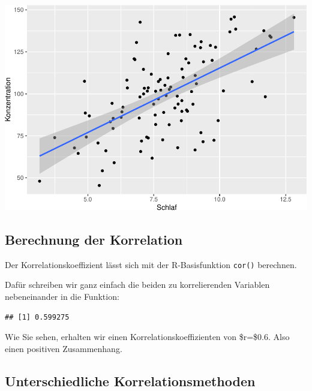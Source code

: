 \documentclass[
]{book}
\newenvironment{Shaded}{\begin{snugshade}}{\end{snugshade}}
\newcommand{\FunctionTok}[1]{\textcolor[rgb]{0.00,0.00,0.00}{#1}}
\newcommand{\NormalTok}[1]{#1}
\newcommand{\SpecialCharTok}[1]{\textcolor[rgb]{0.00,0.00,0.00}{#1}}
\begin{document}
\includegraphics{CFH_R_bookdown_files/figure-latex/unnamed-chunk-115-1.pdf}

\hypertarget{berechnung-der-korrelation}{%
\subsection{Berechnung der Korrelation}\label{berechnung-der-korrelation}}

Der Korrelationskoeffizient lässt sich mit der R-Basisfunktion \texttt{cor()} berechnen.

Dafür schreiben wir ganz einfach die beiden zu korrelierenden Variablen nebeneinander in die Funktion:

\begin{Shaded}
\end{Shaded}

\begin{verbatim}
## [1] 0.599275
\end{verbatim}

Wie Sie sehen, erhalten wir einen Korrelationskoeffizienten von \$r=\$0.6. Also einen positiven Zusammenhang.

\hypertarget{unterschiedliche-korrelationsmethoden}{%
\subsection{Unterschiedliche Korrelationsmethoden}\label{unterschiedliche-korrelationsmethoden}}
\end{document}
